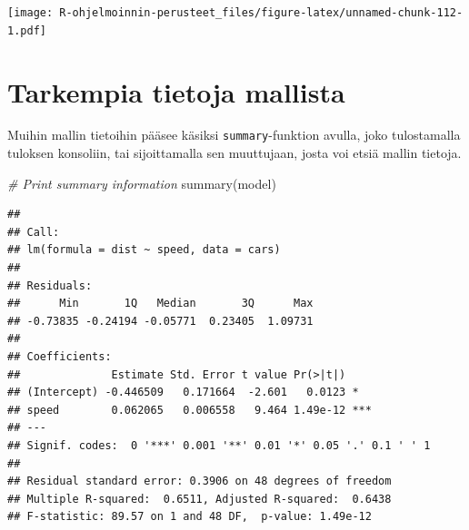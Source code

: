 \documentclass[
]{book}
\newenvironment{Shaded}{\begin{snugshade}}{\end{snugshade}}
\newcommand{\AttributeTok}[1]{\textcolor[rgb]{0.77,0.63,0.00}{#1}}
\newcommand{\CommentTok}[1]{\textcolor[rgb]{0.56,0.35,0.01}{\textit{#1}}}
\newcommand{\DecValTok}[1]{\textcolor[rgb]{0.00,0.00,0.81}{#1}}
\newcommand{\FunctionTok}[1]{\textcolor[rgb]{0.00,0.00,0.00}{#1}}
\newcommand{\NormalTok}[1]{#1}
\newcommand{\SpecialCharTok}[1]{\textcolor[rgb]{0.00,0.00,0.00}{#1}}
\newcommand{\StringTok}[1]{\textcolor[rgb]{0.31,0.60,0.02}{#1}}
\begin{document}
\begin{Shaded}
\end{Shaded}

\texttt{[image: R-ohjelmoinnin-perusteet\_files/figure-latex/unnamed-chunk-112-1.pdf]}

\hypertarget{tarkempia-tietoja-mallista}{%
\section{Tarkempia tietoja mallista}\label{tarkempia-tietoja-mallista}}

Muihin mallin tietoihin pääsee käsiksi \texttt{summary}-funktion avulla, joko tulostamalla tuloksen konsoliin, tai sijoittamalla sen muuttujaan, josta voi etsiä mallin tietoja.

\begin{Shaded}
\begin{Highlighting}[]
\CommentTok{\# Print summary information}
\FunctionTok{summary}\NormalTok{(model)}
\end{Highlighting}
\end{Shaded}

\begin{verbatim}
## 
## Call:
## lm(formula = dist ~ speed, data = cars)
## 
## Residuals:
##      Min       1Q   Median       3Q      Max 
## -0.73835 -0.24194 -0.05771  0.23405  1.09731 
## 
## Coefficients:
##              Estimate Std. Error t value Pr(>|t|)    
## (Intercept) -0.446509   0.171664  -2.601   0.0123 *  
## speed        0.062065   0.006558   9.464 1.49e-12 ***
## ---
## Signif. codes:  0 '***' 0.001 '**' 0.01 '*' 0.05 '.' 0.1 ' ' 1
## 
## Residual standard error: 0.3906 on 48 degrees of freedom
## Multiple R-squared:  0.6511, Adjusted R-squared:  0.6438 
## F-statistic: 89.57 on 1 and 48 DF,  p-value: 1.49e-12
\end{verbatim}
\end{document}
